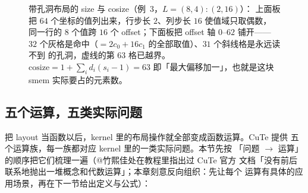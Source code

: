 \begin{figure}[H]
\caption{带孔洞布局的 size 与 cosize（例~3，$L=(8,4){:}(2,16)$）：
上面板把 $64$ 个坐标的值列出来，行步长 $2$、列步长 $16$ 使值域只取偶数，
同一行的 8 个值跨 $16$ 个 offset；下面板把 offset 轴 $0$–$62$ 铺开——
$32$ 个灰格是命中（$=2c_0+16c_1$ 的全部取值）、$31$ 个斜线格是永远读不到
的孔洞，虚线的第 $63$ 格已越界。$\mathrm{cosize}=1+\sum_i d_i(s_i-1)=63$
即「最大偏移加一」，也就是这块 smem 实际要占的元素数。}
\label{fig:20-hole-size-cosize}
\end{figure}

\subsection{五个运算，五类实际问题}

把 layout 当函数以后，kernel 里的布局操作就全部变成函数运算。CuTe 提供
五个运算族，每一族都对应 kernel 里的一类实际问题。本节先按
「问题 $\to$ 运算」的顺序把它们梳理一遍（@竹熙佳处在教程里指出过 CuTe 官方
文档「没有前后联系地抛出一堆概念和代数运算」；本章刻意反向组织：先让每个
运算有具体的应用场景，再在下一节给出定义与公式）：

